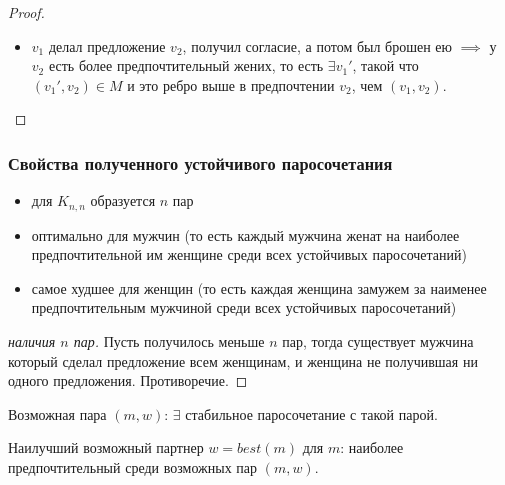 \begin{proof}
\begin{itemize}
        \item $v_1$ делал предложение $v_2$, получил согласие, а потом был брошен ею $\implies$ у $v_2$ есть более предпочтительный жених, то есть $\exists v_1'$, такой что $(v_1', v_2) \in M$ и это ребро выше в предпочтении $v_2$, чем $(v_1,v_2)$.
    \end{itemize}
\end{proof}

\subsubsection*{Свойства полученного устойчивого паросочетания}

\begin{itemize}
    \item для $K_{n,n}$ образуется $n$ пар
    
    \item оптимально для мужчин (то есть каждый мужчина женат на наиболее предпочтительной им женщине среди всех устойчивых паросочетаний)
    
    \item самое худшее для женщин (то есть каждая женщина замужем за наименее предпочтительным мужчиной среди всех устойчивых паросочетаний)
\end{itemize}

\begin{proof}[ наличия $n$ пар]
    
    Пусть получилось меньше $n$ пар, тогда существует мужчина который сделал предложение всем женщинам, и женщина не получившая ни одного предложения. Противоречие.
\end{proof}

\begin{notice}
    Возможная пара $(m, w)$: $\exists$ стабильное паросочетание с такой парой.
\end{notice}

\begin{notice}
    Наилучший возможный партнер $w = best(m)$ для $m$: наиболее предпочтительный среди возможных пар $(m, w)$.
\end{notice}

